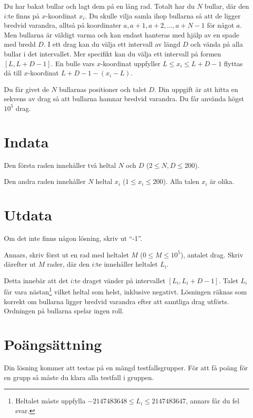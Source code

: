 

Du har bakat bullar och lagt dem på en lång rad. Totalt har du $N$ bullar, där den $i$:te finns på
$x$-koordinat $x_i$. Du skulle vilja samla ihop bullarna så att de ligger bredvid varandra, alltså
på koordinater $a, a+1, a+2, \dots, a+N-1$ för något $a$. Men bullarna är väldigt varma och kan 
endast hanteras med hjälp av en spade med bredd $D$. I ett drag kan du välja ett intervall av längd
$D$ och vända på alla bullar i det intervallet. Mer specifikt kan du välja ett intervall på formen
$[L, L+D-1]$. En bulle vars $x$-koordinat uppfyller $L \leq x_i \leq L+D-1$ flyttas då till $x$-koordinat
$L + D - 1 - (x_i - L)$.

Du får givet de $N$ bullarnas positioner och talet $D$. Din uppgift är att hitta en sekvens av drag
så att bullarna hamnar bredvid varandra. Du får använda högst $10^5$ drag.


\section*{Indata}
Den första raden innehåller två heltal $N$ och $D$ ($2 \leq N, D \leq 200$).

Den andra raden innehåller $N$ heltal $x_i$ ($1 \leq x_i \leq 200$). Alla talen $x_i$ är olika.

\section*{Utdata}
Om det inte finns någon lösning, skriv ut ``-1''.

Annars, skriv först ut en rad med heltalet $M$ ($0 \leq M \leq 10^5$), antalet drag.
Skriv därefter ut $M$ rader, där den $i$:te innehåller heltalet $L_i$.

Detta innebär att det $i$:te draget vänder på intervallet $[L_i, L_i + D - 1]$.
Talet $L_i$ får vara nästan\footnote{Heltalet måste uppfylla $-2147483648 \leq L_i \leq 2147483647$, annars får du fel svar.} vilket heltal som helst, inklusive negativt. 
Lösningen räknas som korrekt om bullarna ligger bredvid varandra efter att samtliga drag utförts.
Ordningen på bullarna spelar ingen roll.

\section*{Poängsättning}
Din lösning kommer att testas på en mängd testfallsgrupper.
För att få poäng för en grupp så måste du klara alla testfall i gruppen.

